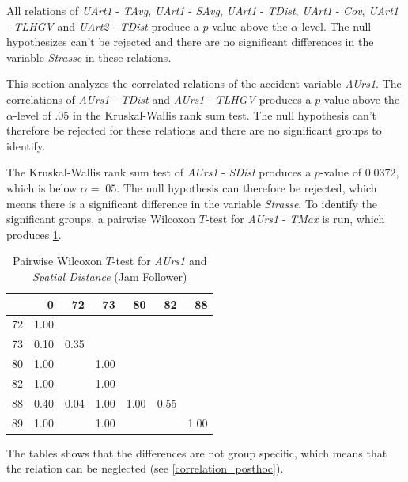 All relations of \textit{UArt1} - \textit{TAvg}, \textit{UArt1} - \textit{SAvg}, \textit{UArt1} - \textit{TDist}, \textit{UArt1} - \textit{Cov}, \textit{UArt1} - \textit{TLHGV} and \textit{UArt2} - \textit{TDist} produce a $p$-value above the $\alpha$-level. The null hypothesizes can't be rejected and there are no significant differences in the variable \textit{Strasse} in these relations.

This section analyzes the correlated relations of the accident variable \textit{AUrs1}. The correlations of \textit{AUrs1} - \textit{TDist} and \textit{AUrs1} - \textit{TLHGV} produces a $p$-value above the $\alpha$-level of .05 in the Kruskal-Wallis rank sum test. The null hypothesis can't therefore be rejected for these relations and there are no significant groups to identify.

The Kruskal-Wallis rank sum test of \textit{AUrs1} - \textit{SDist} produces a $p$-value of 0.0372, which is below $\alpha=.05$. The null hypothesis can therefore be rejected, which means there is a significant difference in the variable \textit{Strasse}. To identify the significant groups, a pairwise Wilcoxon $T$-test for \textit{AUrs1} - \textit{TMax} is run, which produces \cref{tbl:wilcoxon_baysis_follower_AUrs1_SDist}. 
\begin{table}[ht]
	\tiny
	\centering
	\begin{tabular}{rrrrrrr}
		\toprule
		& 0 & 72 & 73 & 80 & 82 & 88 \\ 
		\midrule
		72 & 1.00 &  &  &  &  &  \\ 
		73 & 0.10 & 0.35 &  &  &  &  \\ 
		80 & 1.00 &  & 1.00 &  &  &  \\ 
		82 & 1.00 &  & 1.00 &  &  &  \\ 
		88 & 0.40 & 0.04 & 1.00 & 1.00 & 0.55 &  \\ 
		89 & 1.00 &  & 1.00 &  &  & 1.00 \\ 
		\bottomrule
	  \end{tabular}
    \caption{Pairwise Wilcoxon $T$-test for \textit{AUrs1} and \textit{Spatial Distance} (Jam Follower)}
    \label{tbl:wilcoxon_baysis_follower_AUrs1_SDist}
\end{table}
The tables shows that the differences are not group specific, which means that the relation can be neglected (see \cref{correlation_posthoc}).

